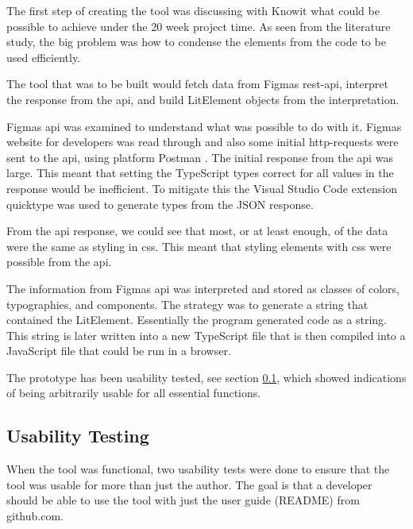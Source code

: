 The first step of creating the tool was discussing with Knowit what could be possible to achieve under the 20 week project time. As seen from the literature study, the big problem was how to condense the elements from the code to be used efficiently. 

The tool that was to be built would fetch data from Figmas \acrshort{rest}-\acrshort{api}, interpret the response from the \acrshort{api}, and build LitElement objects from the interpretation.

Figmas \acrshort{api} was examined to understand what was possible to do with it. Figmas website for developers\cite{figmaFigma} was read through and also some initial \acrshort{http}-requests were sent to the \acrshort{api}, using platform Postman \cite{PostmanCollaborationPlatform}. The initial response from the \acrshort{api} was large. This meant that setting the TypeScript types correct for all values in the response would be inefficient. To mitigate this the Visual Studio Code \cite{VisualStudioCode} extension quicktype\cite{ConvertJSONSwift} was used to generate types from the JSON response. 

From the \acrshort{api} response, we could see that most, or at least enough, of the data were the same as styling in \acrshort{css}. This meant that styling elements with \acrshort{css} were possible from the \acrshort{api}.

The information from Figmas \acrshort{api} was interpreted and stored as classes of colors, typographies, and \glspl{component}. The strategy was to generate a string that contained the LitElement. Essentially the program generated code as a string. This string is later written into a new TypeScript file that is then compiled into a JavaScript file that could be run in a browser.


The prototype has been usability tested, see section \ref{sub:Usability Testing}, which showed indications of being arbitrarily usable for all essential functions. 

\subsection{Usability Testing}%
\label{sub:Usability Testing}
When the tool was functional, two usability tests were done to ensure that the tool was usable for more than just the author. The goal is that a developer should be able to use the tool with just the user guide (README) from github.com. 

